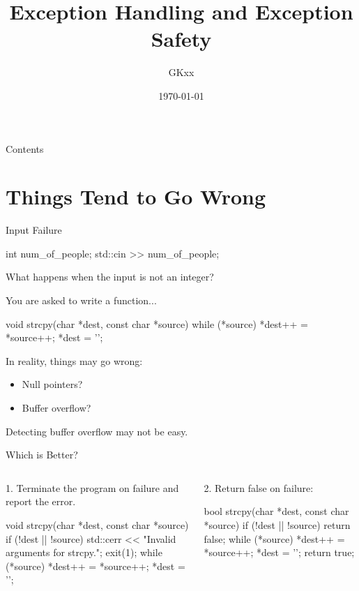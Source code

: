 \documentclass{beamer}
\title{Exception Handling and Exception Safety}
\author{GKxx}
\date{\today}
\begin{document}
\begin{frame}
  \maketitle
\end{frame}

\begin{frame}{Contents}
  \tableofcontents
\end{frame}

\section{Things Tend to Go Wrong}

\begin{frame}[fragile]{Input Failure}
  \begin{cpp}
  int num_of_people;
  std::cin >> num_of_people;
  \end{cpp}
  What happens when the input is not an integer?
\end{frame}

\begin{frame}[fragile]{}
  You are asked to write a  function...
  \begin{cpp}
void strcpy(char *dest, const char *source) {
  while (*source)
    *dest++ = *source++;
  *dest = '\0';
}
  \end{cpp}
  \pause
  In reality, things may go wrong:
  \begin{itemize}
    \item Null pointers?
    \item Buffer overflow?
  \end{itemize}
  Detecting buffer overflow may not be easy.
\end{frame}

\begin{frame}[fragile]{Which is Better?}
  \begin{columns}
    \begin{column}{0.5\textwidth}
      1. Terminate the program on failure and report the error.
      \begin{cpp}
void strcpy(char *dest,
    const char *source) {
  if (!dest || !source) {
    std::cerr << "Invalid arguments for strcpy.\n";
    exit(1);
  }
  while (*source)
    *dest++ = *source++;
  *dest = '\0';
}
      \end{cpp}
    \end{column}
    \begin{column}{0.5\textwidth}
      2. Return false on failure:
      \begin{cpp}
bool strcpy(char *dest,
    const char *source) {
  if (!dest || !source)
    return false;
  while (*source)
    *dest++ = *source++;
  *dest = '\0';
  return true;
}
      \end{cpp}
    \end{column}
  \end{columns}
\end{frame}
\end{document}
